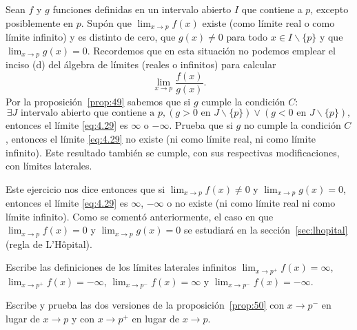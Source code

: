\documentclass[12pt,a4paper]{book}
\begin{document}
    \begin{ejercicio}\label{ej:176}
        Sean $f$ y $g$ funciones definidas en un intervalo abierto $I$ que
        contiene a $p$, excepto posiblemente en $p$. Supón que $\lim_{x\to p}f(x)$ existe (como
        límite real o como límite infinito) y es distinto de cero, que $g(x)\neq 0$ para
        todo $x\in I\backslash\{p\}$ y que $\lim_{x\to p}g(x)=0$. Recordemos que en esta situación no
        podemos emplear el inciso (d) del álgebra de límites (reales o infinitos) para
        calcular
        \begin{equation}\label{eq:4.29}
            \lim_{x\to p}\frac{f(x)}{g(x)}.
        \end{equation}
        Por la proposición~\ref{prop:49} sabemos que si $g$ cumple la condición $C$:
        \begin{equation*}
            \exists J\text{ intervalo abierto que contiene a }p,(g>0\text{ en }J\backslash\{p\})\vee(g<0\text{ en }J\backslash\{p\}),
        \end{equation*}
        entonces el límite \eqref{eq:4.29} es $\infty$ o $-\infty$. Prueba que si $g$ no cumple la condición
        $C$, entonces el límite \eqref{eq:4.29} no existe (ni como límite real, ni como límite
        infinito). Este resultado también se cumple, con sus respectivas modificaciones,
        con límites laterales.

        Este ejercicio nos dice entonces que si $\lim_{x\to p}f(x)\neq 0$ y $\lim_{x\to p}g(x)=0$,
        entonces el límite \eqref{eq:4.29} es $\infty$, $-\infty$ o no existe (ni como límite real ni como
        límite infinito). Como se comentó anteriormente, el caso en que $\lim_{x\to p}f(x)=
        0$ y $\lim_{x\to p}g(x)=0$ se estudiará en la sección~\ref{sec:lhopital} (regla de L'Hôpital).
    \end{ejercicio}

    \begin{ejercicio}\label{ej:177}
        Escribe las definiciones de
        los límites laterales infinitos $\lim_{x\to p^{+}}f(x)=\infty$, $\lim_{x\to p^{+}}f(x)=-\infty$,
        $\lim_{x\to p^{-}}f(x)=\infty$ y $\lim_{x\to p^{-}}f(x)=-\infty$.
    \end{ejercicio}

    \begin{ejercicio}\label{ej:178}
        Escribe y prueba las dos versiones de la proposición~\ref{prop:50} con
        $x\to p^{-}$ en lugar de $x\to p$ y con $x\to p^{+}$ en lugar de $x\to p$.
    \end{ejercicio}
\end{document}
